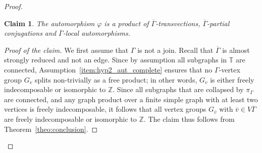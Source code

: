 \documentclass[a4paper,english,11pt]{article}
\newtheorem{Claim}[de]{Claim}
\theoremstyle{definition}
\theoremstyle{remark}
\begin{document}
\begin{proof}
\begin{Claim}\label{Claim:Maline}
The automorphism $\varphi$ is a product of  $\overline{\Gamma}$-transvections, $\overline{\Gamma}$-partial conjugations and $\overline{\Gamma}$-local automorphisms.
\end{Claim}

\begin{proof}[Proof of the claim]
We first assume that $\Gamma$ is not a join. Recall that $\overline{\Gamma}$ is almost strongly reduced and not an edge. Since by assumption all subgraphs in $\mathbb{T}$ are connected, Assumption~\ref{item:hyp2_aut_complete} ensures that no $\Gamma$-vertex group $G_v$ splits non-trivially as a free product; in other words, $G_v$ is either freely indecomposable or isomorphic to $\mathbb{Z}$. Since all subgraphs that are collapsed by $\pi_\Gamma$ are connected, and any graph product over a finite simple graph with at least two vertices is freely indecomposable, it follows that all vertex groups $G_{\bar v}$ with $\bar v\in V\overline{\Gamma}$ are freely indecomposable or isomorphic to $\mathbb{Z}$. The claim thus follows from Theorem~\ref{theo:conclusion}.


\end{proof}
\end{proof}
\end{document}

